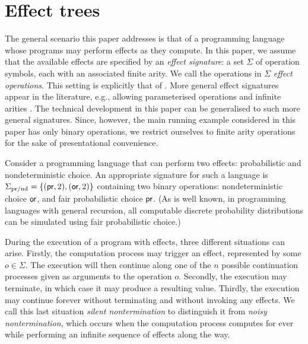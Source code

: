 \section{Effect trees}
\label{section:trees}

The general scenario this paper addresses is that of a programming language whose programs may perform effects as they compute. In this paper, we assume that the available effects are  specified 
by  an \emph{effect signature}: a set $\Sigma$ of operation symbols, each with an associated finite arity. We call the operations in $\Sigma$ \emph{effect operations}. This setting is explicitly that of \cite{plotkin2001adequacy}.
More general effect signatures appear in the literature, e.g., allowing parameterised operations and infinite arities
\cite{gom,StatonInstances}. The technical development in this paper can be generalised to such
more general signatures. Since, however, the main running example considered in this paper has only binary operations, we restrict ourselves to finite arity operations 
for the sake of presentational convenience. %
\begin{example}
\label{example:prnd}
    Consider a programming language that can perform two effects: probabilistic and nondeterministic choice.
    An appropriate signature for such a language is 
    $\Sigma_{\text{pr/nd}} = \{ (\operatorname{\textsf{pr}},2), (\operatorname{\textsf{or}},2) \}$ containing two binary operations:
    nondeterministic choice $\operatorname{\textsf{or}}$, 
    and fair probabilistic choice $\operatorname{\textsf{pr}}$. (As is well known, in programming languages with general recursion, all computable discrete probability distributions can be 
     simulated using fair probabilistic choice.)
 \end{example}

During the execution of a program with effects, three different situations can arise. Firstly, the computation process may
trigger an effect, represented by some $o \in \Sigma$. The execution will then continue along one of the $n$ possible continuation processes given as arguments to the operation $o$. Secondly, the execution may terminate, 
in which case it may produce a resulting value. 
Thirdly, the execution may continue forever without terminating and without invoking any effects. We call this last situation
 \emph{silent nontermination} to distinguish it from \emph{noisy nontermination}, which occurs
 when the computation process computes for ever while performing an infinite sequence of effects along the way.

